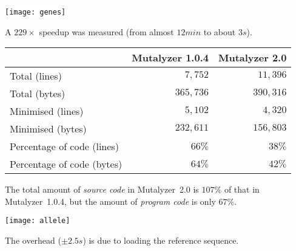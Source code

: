 \documentclass[a4, portrait]{seminar}
\begin{document}
\begin{slide}
  \begin{center}
    \colorbox{white} {
      \texttt{[image: genes]}
    }
  \end{center}
  A $229\times$ speedup was measured (from almost $12min$ to about $3s$).
  \vfill
\end{slide}

\begin{slide}

  \begin{tabular}{l|r|r}
                               & Mutalyzer 1.0.4   & Mutalyzer 2.0\\
    \hline
    Total (lines)              &   $7,\!752$       &  $11,\!396$\\
    Total (bytes)              & $365,\!736$       & $390,\!316$\\
    Minimised (lines)          &   $5,\!102$       &   $4,\!320$\\
    Minimised (bytes)          & $232,\!611$       & $156,\!803$\\
    Percentage of code (lines) &    $66\%$         &    $38\%$\\
    Percentage of code (bytes) &    $64\%$         &    $42\%$
  \end{tabular}
  \bigskip
  \bigskip

  The total amount of \emph{source code} in Mutalyzer~2.0 is $107\%$ of that in
  Mutalyzer~1.0.4, but the amount of \emph{program code} is only $67\%$.
  \vfill
\end{slide}

\begin{slide}
  \begin{center}
    \colorbox{white} {
      \texttt{[image: allele]}
    }
  \end{center}
  The overhead ($\pm 2.5s$) is due to loading the reference sequence.
  \vfill
\end{slide}
\end{document}
